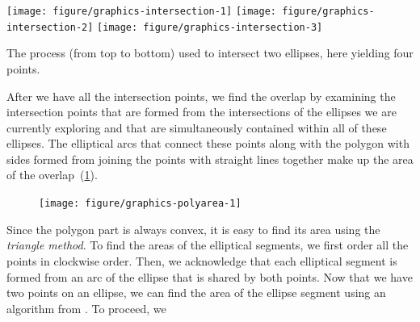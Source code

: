 \documentclass[
  oneside,
  openany,
  numbers=noendperiod,
  parskip=half,
  bibliography=totoc
]{scrbook}\usepackage[]{graphicx}\usepackage{xcolor}
\newenvironment{knitrout}{}{} %
\begin{document}
\begin{marginfigure}
\begin{knitrout}\small
{}\color{fgcolor}

{\centering \texttt{[image: figure/graphics-intersection-1]} 
\texttt{[image: figure/graphics-intersection-2]} 
\texttt{[image: figure/graphics-intersection-3]} 

}



\end{knitrout}
\caption{The process (from top to bottom) used to intersect two ellipses, here
yielding four points.}
\label{fig:intersection}
\end{marginfigure}

After we have all the intersection points, we find the overlap by examining the
intersection points that are formed from the intersections of the ellipses we
are currently exploring and that are simultaneously contained within all of
these ellipses. The elliptical arcs that connect these points along
with the polygon with sides formed from joining the points with straight lines
together make up the area of the overlap~(\cref{fig:polyarea}).

\begin{figure}[hbtp]
\begin{knitrout}\small
{}\color{fgcolor}

{\centering \texttt{[image: figure/graphics-polyarea-1]} 

}



\end{knitrout}
\label{fig:polyarea}
\end{figure}

Since the polygon part is always convex, it is easy to find its area using the
\emph{triangle method}. To find the areas of the elliptical segments, we first
order all the points in clockwise order. Then, we acknowledge that each
elliptical segment is formed from an arc of the ellipse that is shared by both
points. Now that we have
two points on an ellipse, we can find the area of the ellipse segment using an
algorithm from \citet{eberly_2016}. To proceed, we
\end{document}
